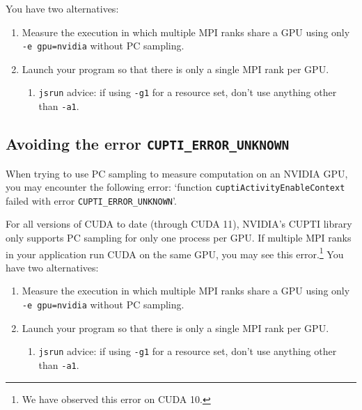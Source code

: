 \documentclass[11pt,twoside,letterpaper]{report}
\begin{document}
You have two alternatives:
\begin{enumerate}
\item Measure the execution in which multiple MPI ranks share a GPU using only {\tt -e gpu=nvidia} without PC sampling.
\item Launch your program so that there is only a single MPI rank per GPU.
\begin{enumerate}
\item {\tt jsrun} advice: if using {\tt -g1} for a resource set, don't use anything other than {\tt -a1}.
\end{enumerate}
\end{enumerate}


\subsection{Avoiding the error {\tt CUPTI\_ERROR\_UNKNOWN}}

When trying to use PC sampling to measure computation on an NVIDIA GPU, you may encounter the following error: `function {\tt cuptiActivityEnableContext} failed with error {\tt CUPTI\_ERROR\_UNKNOWN}'.

For all versions of CUDA  to date (through CUDA 11), NVIDIA's CUPTI library only supports PC sampling for only one process per GPU. If multiple MPI ranks in your application run CUDA on the same GPU, you may see this error.\footnote{We have observed this error on CUDA 10.} You have two alternatives:
\begin{enumerate}
\item Measure the execution in which multiple MPI ranks share a GPU using only {\tt -e gpu=nvidia} without PC sampling.
\item Launch your program so that there is only a single MPI rank per GPU.
\begin{enumerate}
\item {\tt jsrun} advice: if using {\tt -g1} for a resource set, don't use anything other than {\tt -a1}.
\end{enumerate}
\end{enumerate}


\end{document}
